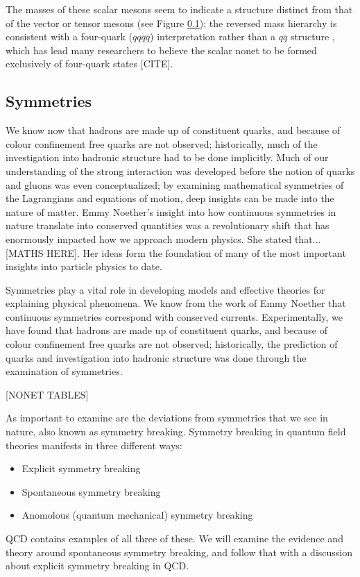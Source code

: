 \documentclass[aps,prd,onecolumn,showpacs,amsmath,amssymb,nofootinbib, 11pt]{revtex4} \pdfoutput=1
\begin{document}
The masses of these scalar mesons seem to indicate a structure distinct from that of the vector or tensor mesons (see Figure \ref{}); the reversed mass hierarchy is consistent with a four-quark ($qq\bar{q}\bar{q}$) interpretation rather than a $q\bar{q}$ structure \cite{Fariborz2010,Jaffe1977}, which has lead many researchers to believe the scalar nonet to be formed exclusively of four-quark states [CITE]. 

\subsection{Symmetries}
We know now that hadrons are made up of constituent quarks, and because of colour confinement free quarks are not observed; historically, much of the investigation into hadronic structure had to be done implicitly. Much of our understanding of the strong interaction was developed before the notion of quarks and gluons was even conceptualized; by examining mathematical symmetries of the Lagrangians and equations of motion, deep insights can be made into the nature of matter. Emmy Noether's insight into how continuous symmetries in nature translate into conserved quantities was a revolutionary shift that has enormously impacted how we approach modern physics. She stated that...[MATHS HERE]. Her ideas form the foundation of many of the most important insights into particle physics to date.

Symmetries play a vital role in developing models and effective theories for explaining physical phenomena. We know from the work of Emmy Noether that continuous symmetries correspond with conserved currents. Experimentally, we have found that hadrons are made up of constituent quarks, and because of colour confinement free quarks are not observed; historically, the prediction of quarks and investigation into hadronic structure was done through the examination of symmetries. 

[NONET TABLES]

As important to examine are the deviations from symmetries that we see in nature, also known as symmetry breaking. Symmetry breaking in quantum field theories manifests in three different ways:
\begin{itemize}
    \item Explicit symmetry breaking
    \item Spontaneous symmetry breaking
    \item Anomolous (quantum mechanical) symmetry breaking
\end{itemize}
QCD contains examples of all three of these. We will examine the evidence and theory around spontaneous symmetry breaking, and follow that with a discussion about explicit symmetry breaking in QCD.
\end{document}
